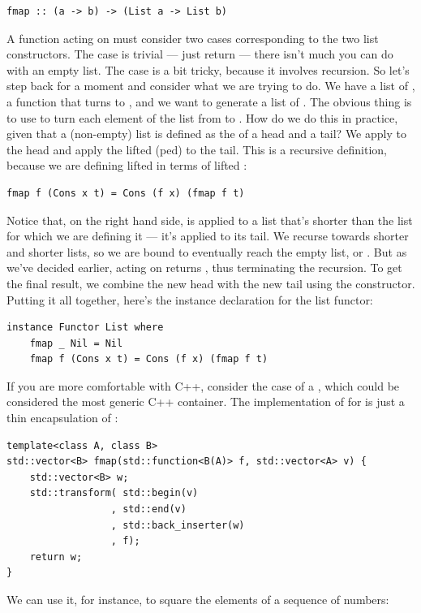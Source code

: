 \begin{Verbatim}[commandchars=\\\{\}]
fmap :: (a -> b) -> (List a -> List b)
\end{Verbatim}
A function acting on  must consider two cases
corresponding to the two list constructors. The  case is
trivial --- just return  --- there isn't much you can do
with an empty list. The  case is a bit tricky, because it
involves recursion. So let's step back for a moment and consider what we
are trying to do. We have a list of , a function 
that turns  to , and we want to generate a list of
. The obvious thing is to use  to turn each element
of the list from  to . How do we do this in
practice, given that a (non-empty) list is defined as the 
of a head and a tail? We apply  to the head and apply the
lifted (ped)  to the tail. This is a recursive
definition, because we are defining lifted  in terms of lifted
:

\begin{Verbatim}[commandchars=\\\{\}]
fmap f (Cons x t) = Cons (f x) (fmap f t)
\end{Verbatim}
Notice that, on the right hand side,  is applied to a
list that's shorter than the list for which we are defining it --- it's
applied to its tail. We recurse towards shorter and shorter lists, so we
are bound to eventually reach the empty list, or . But as
we've decided earlier,  acting on  returns
, thus terminating the recursion. To get the final result,
we combine the new head  with the new tail
 using the  constructor. Putting it
all together, here's the instance declaration for the list functor:

\begin{Verbatim}[commandchars=\\\{\}]
instance Functor List where
    fmap _ Nil = Nil
    fmap f (Cons x t) = Cons (f x) (fmap f t)
\end{Verbatim}
If you are more comfortable with C++, consider the case of a
, which could be considered the most generic C++
container. The implementation of  for 
is just a thin encapsulation of :

\begin{Verbatim}[commandchars=\\\{\}]
template<class A, class B>
std::vector<B> fmap(std::function<B(A)> f, std::vector<A> v) {
    std::vector<B> w;
    std::transform( std::begin(v)
                  , std::end(v)
                  , std::back_inserter(w)
                  , f); 
    return w;
}
\end{Verbatim}
We can use it, for instance, to square the elements of a sequence of
numbers:

